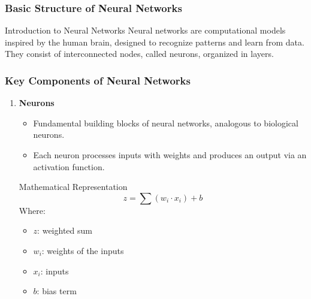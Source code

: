 \documentclass[aspectratio=169]{beamer}
\begin{document}
\begin{frame}[fragile]
    \frametitle{Basic Structure of Neural Networks}
    \begin{block}{Introduction to Neural Networks}
        Neural networks are computational models inspired by the human brain, designed to recognize patterns and learn from data.
        They consist of interconnected nodes, called neurons, organized in layers.
    \end{block}
\end{frame}

\begin{frame}[fragile]
    \frametitle{Key Components of Neural Networks}
    \begin{enumerate}
        \item \textbf{Neurons}
        \begin{itemize}
            \item Fundamental building blocks of neural networks, analogous to biological neurons.
            \item Each neuron processes inputs with weights and produces an output via an activation function.
        \end{itemize}
        \begin{block}{Mathematical Representation}
            \begin{equation}
              z = \sum (w_i \cdot x_i) + b
            \end{equation}
            Where:
            \begin{itemize}
                \item \( z \): weighted sum
                \item \( w_i \): weights of the inputs
                \item \( x_i \): inputs
                \item \( b \): bias term
            \end{itemize}
        \end{block}
    \end{enumerate}
\end{frame}
\end{document}
